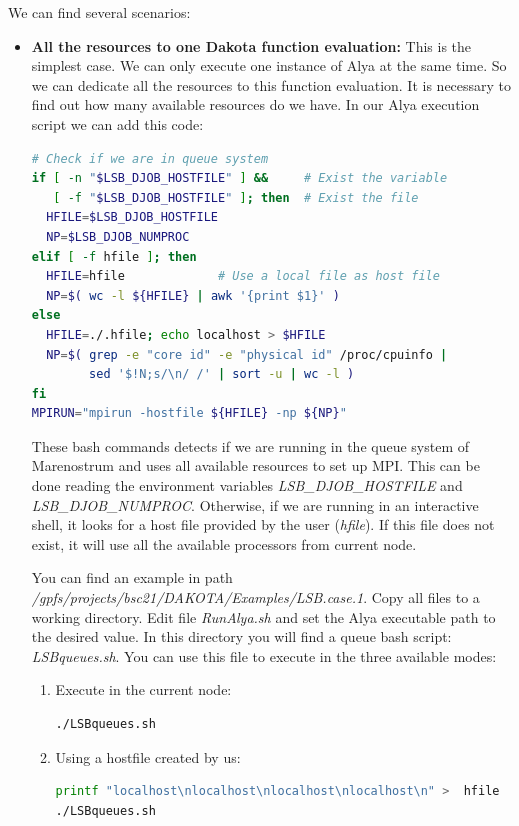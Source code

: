 \documentclass[12pt,a4paper,article]{memoir}
\begin{document}
We can find several scenarios:
\begin{itemize}
\item \textbf{All the resources to one Dakota function evaluation:}
This is the simplest case. We can only execute one instance of Alya at the same time. So we can dedicate all the resources to this function evaluation. It is necessary to find out how many available resources do we have. In our Alya execution script we can add this code:

\begin{lstlisting}[style=MyCodeStyle,language=bash]
# Check if we are in queue system
if [ -n "$LSB_DJOB_HOSTFILE" ] &&     # Exist the variable
   [ -f "$LSB_DJOB_HOSTFILE" ]; then  # Exist the file
  HFILE=$LSB_DJOB_HOSTFILE
  NP=$LSB_DJOB_NUMPROC
elif [ -f hfile ]; then
  HFILE=hfile             # Use a local file as host file
  NP=$( wc -l ${HFILE} | awk '{print $1}' )
else
  HFILE=./.hfile; echo localhost > $HFILE
  NP=$( grep -e "core id" -e "physical id" /proc/cpuinfo |
        sed '$!N;s/\n/ /' | sort -u | wc -l )
fi
MPIRUN="mpirun -hostfile ${HFILE} -np ${NP}"
\end{lstlisting}

These bash commands detects if we are running in the queue system of Marenostrum and uses all available resources to set up MPI. This can be done reading the environment variables \textit{LSB\_DJOB\_HOSTFILE} and \textit{LSB\_DJOB\_NUMPROC}. Otherwise, if we are running in an interactive shell, it looks for a host file provided by the user (\textit{hfile}). If this file does not exist, it will use all the available processors from current node.

You can find an example in path \textit{/gpfs/projects/bsc21/DAKOTA/Examples/LSB.case.1}. Copy all files to a working directory. Edit file \textit{RunAlya.sh} and set the Alya executable path to the desired value. In this directory you will find a queue bash script: \textit{LSBqueues.sh}. You can use this file to execute in the three available modes:

\begin{enumerate}
\item Execute in the current node:
\begin{lstlisting}[style=MyCodeStyle,language=bash]
./LSBqueues.sh
\end{lstlisting}

\item Using a hostfile created by us:
\begin{lstlisting}[style=MyCodeStyle,language=bash]
printf "localhost\nlocalhost\nlocalhost\nlocalhost\n" >  hfile
./LSBqueues.sh
\end{lstlisting}


\end{enumerate}
\end{itemize}
\end{document}
